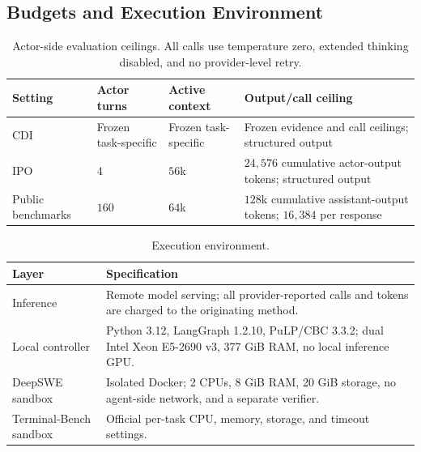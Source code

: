 \subsection{Budgets and Execution Environment}
\begin{table}[H]
\centering
\normalsize
\renewcommand{\arraystretch}{1.14}
\caption{Actor-side evaluation ceilings. All calls use temperature zero, extended thinking disabled, and no provider-level retry.}
\begin{tabularx}{0.94\textwidth}{@{}p{} p{} p{} X@{}}
\toprule
\textbf{Setting} & \textbf{Actor turns} & \textbf{Active context} & \textbf{Output/call ceiling} \\
\midrule
CDI & Frozen task-specific & Frozen task-specific & Frozen evidence and call ceilings; structured output \\
IPO & $4$ & $56$k & $24{,}576$ cumulative actor-output tokens; structured output \\
Public benchmarks & $160$ & $64$k & $128$k cumulative assistant-output tokens; $16{,}384$ per response \\
\bottomrule
\end{tabularx}
\end{table}
\begin{table}[H]
\centering
\normalsize
\renewcommand{\arraystretch}{1.14}
\caption{Execution environment.}
\begin{tabularx}{0.94\textwidth}{@{}p{} X@{}}
\toprule
\textbf{Layer} & \textbf{Specification} \\
\midrule
Inference & Remote model serving; all provider-reported calls and tokens are charged to the originating method. \\
Local controller & Python 3.12, LangGraph 1.2.10, PuLP/CBC 3.3.2; dual Intel Xeon E5-2690 v3, 377 GiB RAM, no local inference GPU. \\
DeepSWE sandbox & Isolated Docker; 2 CPUs, 8 GiB RAM, 20 GiB storage, no agent-side network, and a separate verifier. \\
Terminal-Bench sandbox & Official per-task CPU, memory, storage, and timeout settings. \\
\bottomrule
\end{tabularx}
\end{table}

